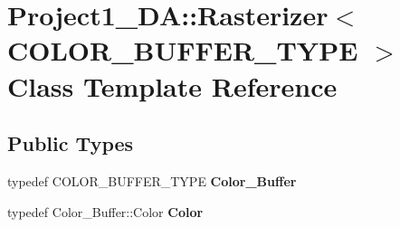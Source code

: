 \hypertarget{class_project1__3_d_a_1_1_rasterizer}{}\section{Project1\+\_\+DA\+::Rasterizer$<$ C\+O\+L\+O\+R\+\_\+\+B\+U\+F\+F\+E\+R\+\_\+\+T\+Y\+PE $>$ Class Template Reference}
\label{class_project1__3_d_a_1_1_rasterizer}
\subsection*{Public Types}
\begin{DoxyCompactItemize}
\item 
\mbox{\label{class_project1__3_d_a_1_1_rasterizer_a858eaa101a5f7d7c9fa6e0c52b61738c}} 
typedef C\+O\+L\+O\+R\+\_\+\+B\+U\+F\+F\+E\+R\+\_\+\+T\+Y\+PE {\bfseries Color\+\_\+\+Buffer}
\item 
\mbox{\label{class_project1__3_d_a_1_1_rasterizer_a18da61922853db42dc8388d5e2c77765}} 
typedef Color\+\_\+\+Buffer\+::\+Color {\bfseries Color}
\end{DoxyCompactItemize}

